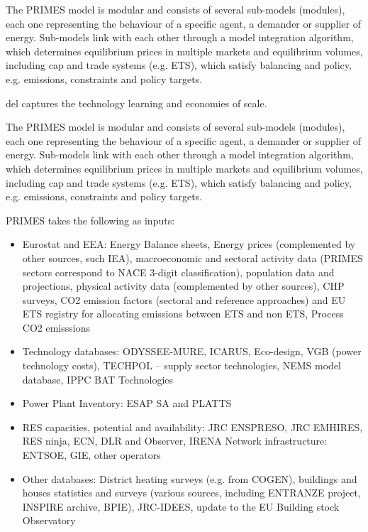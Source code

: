 \documentclass[lettersize,journal]{IEEEtran}
\begin{document}
  
  The PRIMES model is modular and consists of several sub-models (modules), each one representing the behaviour of a specific agent, a demander or supplier of energy. Sub-models link with each other through a model integration algorithm, which determines equilibrium prices in multiple markets and equilibrium volumes, including cap and trade systems (e.g. ETS), which satisfy balancing and policy, e.g. emissions, constraints and policy targets.

  del captures the technology learning and economies of scale.

  The PRIMES model is modular and consists of several sub-models (modules), each one representing the behaviour of a specific agent, a demander or supplier of energy. Sub-models link with each other through a model integration algorithm, which determines equilibrium prices in multiple markets and equilibrium volumes, including cap and trade systems (e.g. ETS), which satisfy balancing and policy, e.g. emissions, constraints and policy targets.

  PRIMES takes the following as inputs:
  \begin{itemize}
  \item Eurostat and EEA: Energy Balance sheets, Energy prices (complemented by other sources, such IEA), macroeconomic and sectoral activity data (PRIMES sectors correspond to NACE 3-digit classification), population data and projections, physical activity data (complemented by other sources), CHP surveys, CO2 emission factors (sectoral and reference approaches) and EU ETS registry for allocating emissions between ETS and non ETS, Process CO2 emisssions

  \item Technology databases: ODYSSEE-MURE, ICARUS, Eco-design, VGB (power technology costs), TECHPOL – supply sector technologies, NEMS model database, IPPC BAT Technologies

  \item Power Plant Inventory: ESAP SA and PLATTS

  \item RES capacities, potential and availability: JRC ENSPRESO, JRC EMHIRES, RES ninja, ECN, DLR and Observer, IRENA Network infrastructure: ENTSOE, GIE, other operators

  \item Other databases: District heating surveys (e.g. from COGEN), buildings and houses statistics and surveys (various sources, including ENTRANZE project, INSPIRE archive, BPIE), JRC-IDEES, update to the EU Building stock Observatory
  \end{itemize}
\end{document}
